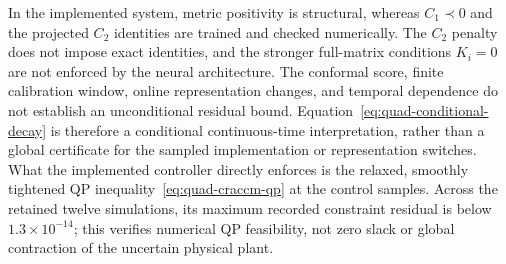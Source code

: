 \documentclass[11pt]{article}
\begin{document}
In the implemented system, metric positivity is structural, whereas
$C_1\prec0$ and the projected $C_2$ identities are trained and checked
numerically. The $C_2$ penalty does not impose exact identities, and
the stronger full-matrix conditions $K_i=0$ are not enforced by the
neural architecture. The conformal score, finite calibration window,
online representation changes, and temporal dependence do not establish
an unconditional residual bound. Equation~\eqref{eq:quad-conditional-decay}
is therefore a conditional continuous-time interpretation, rather than
a global certificate for the sampled implementation or representation
switches. What the implemented controller directly enforces is the
relaxed, smoothly tightened QP inequality~\eqref{eq:quad-craccm-qp}
at the control samples. Across the retained twelve simulations, its
maximum recorded constraint residual is below $1.3\times10^{-14}$;
this verifies numerical QP feasibility, not zero slack or global
contraction of the uncertain physical plant.
\end{document}

